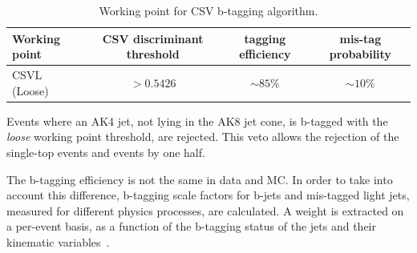 % 

\begin{table}[!htb]
  \centering
  \label{tab:btag}
  \caption{Working point for CSV b-tagging algorithm.}
  \begin{tabular}{l|ccc}
     Working point & CSV discriminant threshold & tagging efficiency & mis-tag probability\\ 
    \hline
 \hline
     CSVL (Loose)  & $>0.5426$ & $\sim85\%$ & $\sim 10\%$  \\ 
  \end{tabular}

  
\end{table}

\noindent Events where an AK4 jet, not lying in the AK8 jet cone, is b-tagged with the \emph{loose} working point threshold, are rejected. This veto allows the rejection of the single-top events and \ttbar events by one half.

\noindent The b-tagging efficiency is not the same in data and MC. In order to take into account this difference, b-tagging scale factors for b-jets and mis-tagged light jets, measured for different physics processes, are calculated. A weight is extracted on a per-event basis, as a function of the b-tagging status of the jets and their kinematic variables~\cite{bib:btagsf}.

